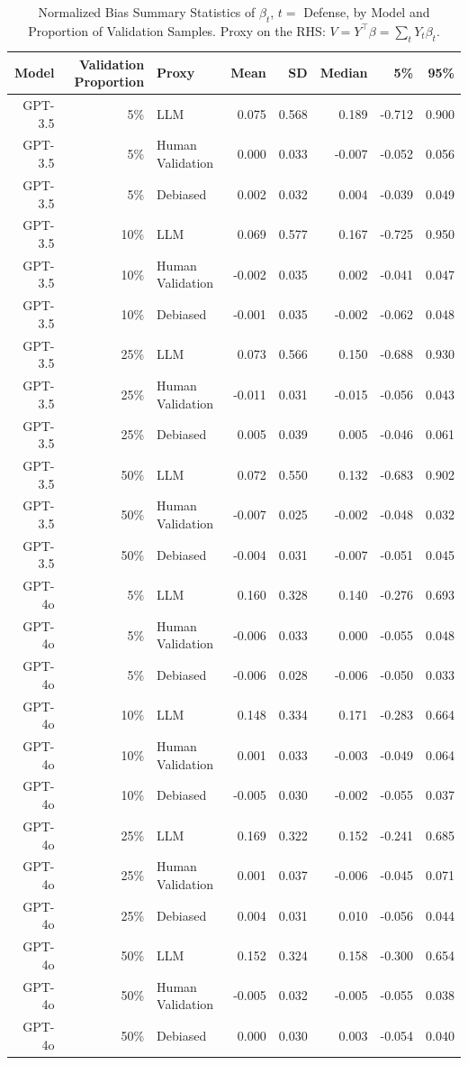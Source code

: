 \begin{table}

\caption{Normalized Bias Summary Statistics of $\beta_{t}$, $t=$ Defense, by Model and Proportion of Validation Samples.
      Proxy on the RHS: $V = Y^\top \beta = \sum_{t} Y_t \beta_t$.}
\centering
\begin{tabular}[t]{rrlrrrrr}
\toprule
Model & Validation Proportion & Proxy & Mean & SD & Median & 5\% & 95\%\\
\midrule
GPT-3.5 & 5\% & LLM & 0.075 & 0.568 & 0.189 & -0.712 & 0.900\\
GPT-3.5 & 5\% & Human Validation & 0.000 & 0.033 & -0.007 & -0.052 & 0.056\\
GPT-3.5 & 5\% & Debiased & 0.002 & 0.032 & 0.004 & -0.039 & 0.049\\
GPT-3.5 & 10\% & LLM & 0.069 & 0.577 & 0.167 & -0.725 & 0.950\\
GPT-3.5 & 10\% & Human Validation & -0.002 & 0.035 & 0.002 & -0.041 & 0.047\\
GPT-3.5 & 10\% & Debiased & -0.001 & 0.035 & -0.002 & -0.062 & 0.048\\
GPT-3.5 & 25\% & LLM & 0.073 & 0.566 & 0.150 & -0.688 & 0.930\\
GPT-3.5 & 25\% & Human Validation & -0.011 & 0.031 & -0.015 & -0.056 & 0.043\\
GPT-3.5 & 25\% & Debiased & 0.005 & 0.039 & 0.005 & -0.046 & 0.061\\
GPT-3.5 & 50\% & LLM & 0.072 & 0.550 & 0.132 & -0.683 & 0.902\\
GPT-3.5 & 50\% & Human Validation & -0.007 & 0.025 & -0.002 & -0.048 & 0.032\\
GPT-3.5 & 50\% & Debiased & -0.004 & 0.031 & -0.007 & -0.051 & 0.045\\
GPT-4o & 5\% & LLM & 0.160 & 0.328 & 0.140 & -0.276 & 0.693\\
GPT-4o & 5\% & Human Validation & -0.006 & 0.033 & 0.000 & -0.055 & 0.048\\
GPT-4o & 5\% & Debiased & -0.006 & 0.028 & -0.006 & -0.050 & 0.033\\
GPT-4o & 10\% & LLM & 0.148 & 0.334 & 0.171 & -0.283 & 0.664\\
GPT-4o & 10\% & Human Validation & 0.001 & 0.033 & -0.003 & -0.049 & 0.064\\
GPT-4o & 10\% & Debiased & -0.005 & 0.030 & -0.002 & -0.055 & 0.037\\
GPT-4o & 25\% & LLM & 0.169 & 0.322 & 0.152 & -0.241 & 0.685\\
GPT-4o & 25\% & Human Validation & 0.001 & 0.037 & -0.006 & -0.045 & 0.071\\
GPT-4o & 25\% & Debiased & 0.004 & 0.031 & 0.010 & -0.056 & 0.044\\
GPT-4o & 50\% & LLM & 0.152 & 0.324 & 0.158 & -0.300 & 0.654\\
GPT-4o & 50\% & Human Validation & -0.005 & 0.032 & -0.005 & -0.055 & 0.038\\
GPT-4o & 50\% & Debiased & 0.000 & 0.030 & 0.003 & -0.054 & 0.040\\
\bottomrule
\end{tabular}
\end{table}

